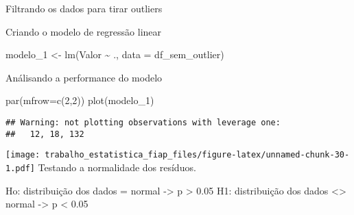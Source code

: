 \documentclass[
]{article}
\newenvironment{Shaded}{\begin{snugshade}}{\end{snugshade}}
\newcommand{\AttributeTok}[1]{\textcolor[rgb]{0.77,0.63,0.00}{#1}}
\newcommand{\DecValTok}[1]{\textcolor[rgb]{0.00,0.00,0.81}{#1}}
\newcommand{\FloatTok}[1]{\textcolor[rgb]{0.00,0.00,0.81}{#1}}
\newcommand{\FunctionTok}[1]{\textcolor[rgb]{0.00,0.00,0.00}{#1}}
\newcommand{\NormalTok}[1]{#1}
\newcommand{\OtherTok}[1]{\textcolor[rgb]{0.56,0.35,0.01}{#1}}
\newcommand{\SpecialCharTok}[1]{\textcolor[rgb]{0.00,0.00,0.00}{#1}}
\begin{document}
Filtrando os dados para tirar outliers

\begin{Shaded}
\end{Shaded}

Criando o modelo de regressão linear

\begin{Shaded}
\begin{Highlighting}[]
\NormalTok{modelo\_1 }\OtherTok{\textless{}{-}} \FunctionTok{lm}\NormalTok{(Valor }\SpecialCharTok{\textasciitilde{}}\NormalTok{ ., }\AttributeTok{data =}\NormalTok{ df\_sem\_outlier)}
\end{Highlighting}
\end{Shaded}

Análisando a performance do modelo

\begin{Shaded}
\begin{Highlighting}[]
\FunctionTok{par}\NormalTok{(}\AttributeTok{mfrow=}\FunctionTok{c}\NormalTok{(}\DecValTok{2}\NormalTok{,}\DecValTok{2}\NormalTok{))}
\FunctionTok{plot}\NormalTok{(modelo\_1)}
\end{Highlighting}
\end{Shaded}

\begin{verbatim}
## Warning: not plotting observations with leverage one:
##   12, 18, 132
\end{verbatim}

\texttt{[image: trabalho\_estatistica\_fiap\_files/figure-latex/unnamed-chunk-30-1.pdf]}
Testando a normalidade dos resíduos.

Ho: distribuição dos dados = normal -\textgreater{} p \textgreater{}
0.05 H1: distribuição dos dados \textless\textgreater{} normal
-\textgreater{} p \textless{} 0.05

\begin{Shaded}
\end{Shaded}
\end{document}
